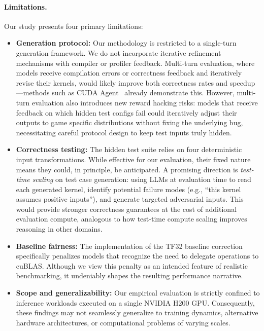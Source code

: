 \documentclass[11pt]{article}
\begin{document}
\paragraph{Limitations.} Our study presents four primary limitations:
\begin{itemize}
    \item \textbf{Generation protocol:} Our methodology is restricted to a single-turn generation framework. We do not incorporate iterative refinement mechanisms with compiler or profiler feedback. Multi-turn evaluation, where models receive compilation errors or correctness feedback and iteratively revise their kernels, would likely improve both correctness rates and speedup---methods such as CUDA Agent~\cite{DBLP:journals/corr/abs-2602-24286} already demonstrate this. However, multi-turn evaluation also introduces new reward hacking risks: models that receive feedback on which hidden test configs fail could iteratively adjust their outputs to game specific distributions without fixing the underlying bug, necessitating careful protocol design to keep test inputs truly hidden.
    \item \textbf{Correctness testing:} The hidden test suite relies on four deterministic input transformations. While effective for our evaluation, their fixed nature means they could, in principle, be anticipated. A promising direction is \emph{test-time scaling} on test case generation: using LLMs at evaluation time to read each generated kernel, identify potential failure modes (e.g., ``this kernel assumes positive inputs''), and generate targeted adversarial inputs. This would provide stronger correctness guarantees at the cost of additional evaluation compute, analogous to how test-time compute scaling improves reasoning in other domains.
    \item \textbf{Baseline fairness:} The implementation of the TF32 baseline correction specifically penalizes models that recognize the need to delegate operations to cuBLAS. Although we view this penalty as an intended feature of realistic benchmarking, it undeniably shapes the resulting performance narrative.
    \item \textbf{Scope and generalizability:} Our empirical evaluation is strictly confined to inference workloads executed on a single NVIDIA H200 GPU. Consequently, these findings may not seamlessly generalize to training dynamics, alternative hardware architectures, or computational problems of varying scales.
\end{itemize}
\end{document}
